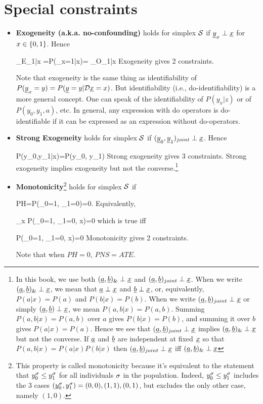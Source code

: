 \section{Special constraints}
\begin{itemize}
\item
{\bf Exogeneity (a.k.a. no-confounding)}
holds for simplex ${\cal S}$
if
${\underline{y}}_x\perp {\underline{x}}$ for $x\in\{0,1\}$.
 Hence

\beq
{}_{E_{1|x}}
=P(\rvy_x=1|x)=
_{O_{1|x}}
\quad {}
\eeq
Exogeneity gives {\color{red}2 constraints}.

Note that exogeneity
is the same thing as identifiability
of $P({\underline{y}}_x=y)=P({\underline{y}}=y|{\cal D}{\underline{x}}=x)$.
But identifiability
(i.e., do-identifiability) is a more
general concept. One can speak
of the identifiability of $P(y_x|z)$
or of $P(y_0, y_1, a)$, etc.
In general,
any expression with
do operators is do-identifiable
if it can be expressed
as an expression without
do-operators.

\item
{\bf Strong Exogeneity} holds
for simplex ${\cal S}$
if $({\underline{y}}_0, {\underline{y}}_1)_{joint}
\perp {\underline{x}}$. Hence

\beq
P(y_0,y_1|x)=P(y_0, y_1)
\label{eq-strong-exogen}
\eeq
Strong exogeneity gives {\color{red} 3 constraints}.
Strong exogeneity implies
exogeneity
but not the converse.\footnote{In
this book, we use both
$({\underline{a}}, {\underline{b}})_\&\perp {\underline{x}}$
and $({\underline{a}}, {\underline{b}})_{joint}\perp {\underline{x}}$.
When we write $({\underline{a}}, {\underline{b}})_\&\perp {\underline{x}}$,
we mean that
${\underline{a}}\perp {\underline{x}}$
and ${\underline{b}}\perp{\underline{x}}$,
or, equivalently,
$P(a|x)=P(a)$
and $P(b|x)=P(b)$.
When we write
$({\underline{a}}, {\underline{b}})_{joint}\perp {\underline{x}}$
or simply $({\underline{a}}, {\underline{b}})\perp {\underline{x}}$,
we mean $P(a,b|x)=P(a,b)$.
Summing
$P(a,b|x)=P(a,b)$
over $a$ gives
$P(b|x)=P(b)$,
and summing it
over $b$ gives
$P(a|x)=P(a)$.
Hence we see that
 $({\underline{a}}, {\underline{b}})_{joint}\perp {\underline{x}}$
implies
$({\underline{a}}, {\underline{b}})_\&\perp {\underline{x}}$
but not the converse.
If ${\underline{a}}$ and ${\underline{b}}$ are independent at
fixed ${\underline{x}}$ so that
$P(a,b|x)=P(a|x)P(b|x)$ then
$({\underline{a}}, {\underline{b}})_{joint}\perp {\underline{x}}$
iff
$({\underline{a}}, {\underline{b}})_\&\perp {\underline{x}}$
}
\item
{\bf Monotonicity}\footnote{
This property is called monotonicity
 because
it's equivalent to the statement
that $y_0^\sigma\leq y_1^\sigma$ for
all individuals $\sigma$
in the population.
Indeed, $y_0^\sigma\leq y_1^\sigma$
includes the 3 cases $(y_0^\sigma, y_1^\sigma)=
(0,0), (1, 1), (0,1)$, but
excludes the only other
case, namely $(1,0)$.}
 holds for simplex ${\cal S}$ if

\beq PH=P(\rvy_0=1,
 \rvy_1=0)=0\eeq\;.
Equivalently,

\beq
\sum_x P(\rvy_0=1, \rvy_1=0, x)=0
\eeq
which is true iff

\beq
 P(\rvy_0=1, \rvy_1=0, x)=0\quad
{}
\eeq
Monotonicity gives {\color{red} 2
constraints}.

Note that when $PH=0$, $PNS=ATE$.
\end{itemize}



